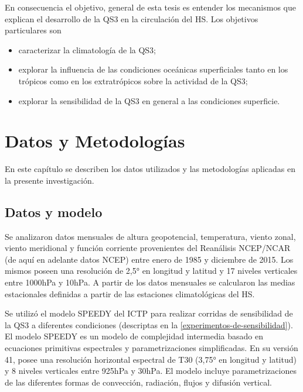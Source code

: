 \documentclass[spanish,a4paper,12pt,oneside]{book}
\providecommand{\tightlist}{%
  \setlength{\itemsep}{0pt}\setlength{\parskip}{0pt}}
\begin{document}
En consecuencia el objetivo, general de esta tesis es entender los
mecanismos que explican el desarrollo de la QS3 en la circulación del
HS. Los objetivos particulares son

\begin{itemize}
\tightlist
\item
  caracterizar la climatología de la QS3;
\item
  explorar la influencia de las condiciones oceánicas superficiales
  tanto en los trópicos como en los extratrópicos sobre la actividad de
  la QS3;
\item
  explorar la sensibilidad de la QS3 en general a las condiciones
  superficie.
\end{itemize}

\chapter{Datos y Metodologías}\label{datos-y-metodologias}

En este capítulo se describen los datos utilizados y las metodologías
aplicadas en la presente investigación.

\section{Datos y modelo}\label{datos-y-modelo}

Se analizaron datos mensuales de altura geopotencial, temperatura,
viento zonal, viento meridional y función corriente provenientes del
Reanálisis NCEP/NCAR \citep{Kalnay1996} (de aquí en adelante datos NCEP)
entre enero de 1985 y diciembre de 2015. Los mismos poseen una
resolución de 2,5° en longitud y latitud y 17 niveles verticales entre
1000hPa y 10hPa. A partir de los datos mensuales se calcularon las
medias estacionales definidas a partir de las estaciones climatológicas
del HS.

Se utilizó el modelo SPEEDY del ICTP para realizar corridas de
sensibilidad de la QS3 a diferentes condiciones (descriptas en la
\autoref{experimentos-de-sensibilidad}). El modelo SPEEDY
\citep{Molteni2003, Kucharski2006} es un modelo de complejidad
intermedia basado en ecuaciones primitivas espectrales y
parametrizaciones simplificadas. En su versión 41, posee una resolución
horizontal espectral de T30 (3,75° en longitud y latitud) y 8 niveles
verticales entre 925hPa y 30hPa. El modelo incluye parametrizaciones de
las diferentes formas de convección, radiación, flujos y difusión
vertical.
\end{document}
